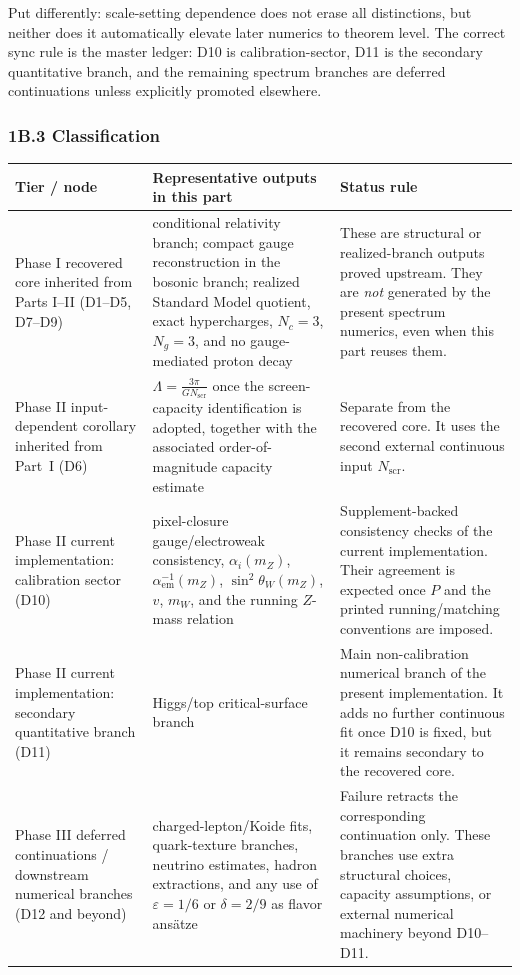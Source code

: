 Put differently: scale-setting dependence does not erase all distinctions, but neither does it automatically elevate later numerics to theorem level. The correct sync rule is the master ledger: D10 is calibration-sector, D11 is the secondary quantitative branch, and the remaining spectrum branches are deferred continuations unless explicitly promoted elsewhere.

\subsubsection{1B.3 Classification}\label{1b3-classification}

{\footnotesize
\def\LTcaptype{none}
\begin{longtable}[]{@{}>{\RaggedRight\arraybackslash}p{}>{\RaggedRight\arraybackslash}p{}>{\RaggedRight\arraybackslash}p{}@{}}
\toprule
Tier / node & Representative outputs in this part & Status rule \\
\midrule
\endhead
\bottomrule
\endfoot
Phase I recovered core inherited from Parts I--II (D1--D5, D7--D9) & conditional relativity branch; compact gauge reconstruction in the bosonic branch; realized Standard Model quotient, exact hypercharges, \(N_c=3\), \(N_g=3\), and no gauge-mediated proton decay & These are structural or realized-branch outputs proved upstream. They are \emph{not} generated by the present spectrum numerics, even when this part reuses them. \\
Phase II input-dependent corollary inherited from Part~I (D6) & \(\Lambda=\frac{3\pi}{G N_{\mathrm{scr}}}\) once the screen-capacity identification is adopted, together with the associated order-of-magnitude capacity estimate & Separate from the recovered core. It uses the second external continuous input \(N_{\mathrm{scr}}\). \\
Phase II current implementation: calibration sector (D10) & pixel-closure gauge/electroweak consistency, \(\alpha_i(m_Z)\), \(\alpha_{\mathrm{em}}^{-1}(m_Z)\), \(\sin^2\theta_W(m_Z)\), \(v\), \(m_W\), and the running \(Z\)-mass relation & Supplement-backed consistency checks of the current implementation. Their agreement is expected once \(P\) and the printed running/matching conventions are imposed. \\
Phase II current implementation: secondary quantitative branch (D11) & Higgs/top critical-surface branch & Main non-calibration numerical branch of the present implementation. It adds no further continuous fit once D10 is fixed, but it remains secondary to the recovered core. \\
Phase III deferred continuations / downstream numerical branches (D12 and beyond) & charged-lepton/Koide fits, quark-texture branches, neutrino estimates, hadron extractions, and any use of \(\varepsilon=1/6\) or \(\delta=2/9\) as flavor ans\"atze & Failure retracts the corresponding continuation only. These branches use extra structural choices, capacity assumptions, or external numerical machinery beyond D10--D11. \\
\end{longtable}
}


